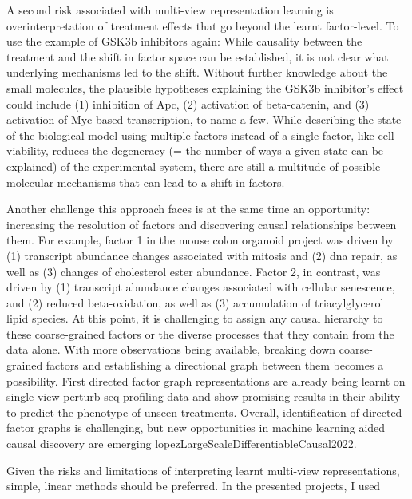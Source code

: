 \begin{flushleft}
A second risk associated with multi-view representation learning is overinterpretation of treatment effects that go beyond the learnt factor-level. To use the example of GSK3b inhibitors again: While causality between the treatment and the shift in factor space can be established, it is not clear what underlying mechanisms led to the shift. Without further knowledge about the small molecules, the plausible hypotheses explaining the GSK3b inhibitor's effect could include (1) inhibition of Apc, (2) activation of beta-catenin, and (3) activation of Myc based transcription, to name a few. While describing the state of the biological model using multiple factors instead of a single factor, like cell viability, reduces the degeneracy (= the number of ways a given state can be explained) of the experimental system, there are still a multitude of possible molecular mechanisms that can lead to a shift in factors.
\bigbreak

Another challenge this approach faces is at the same time an opportunity: increasing the resolution of factors and discovering causal relationships between them. For example, factor 1 in the mouse colon organoid project was driven by (1) transcript abundance changes associated with mitosis and (2) dna repair, as well as (3) changes of cholesterol ester abundance. Factor 2, in contrast, was driven by (1) transcript abundance changes associated with cellular senescence, and (2) reduced beta-oxidation, as well as (3) accumulation of triacylglycerol lipid species. At this point, it is challenging to assign any causal hierarchy to these coarse-grained factors or the diverse processes that they contain from the data alone. With more observations being available, breaking down coarse-grained factors and establishing a directional graph between them becomes a possibility. First directed factor graph representations are already being learnt on single-view perturb-seq profiling data and show promising results in their ability to predict the phenotype of unseen treatments. Overall, identification of directed factor graphs is challenging, but new opportunities in machine learning aided causal discovery are emerging lopezLargeScaleDifferentiableCausal2022.
\bigbreak

Given the risks and limitations of interpreting learnt multi-view representations, simple, linear methods should be preferred. In the presented projects, I used 

\end{flushleft}

